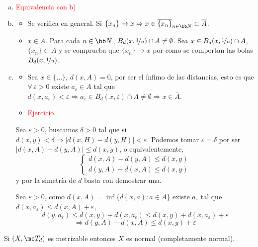 \begin{sol} \,
    \begin{enumerate}[a)]
        \item \textcolor{red}{Equivalencia con b)}
        \item \begin{itemize}
        \item[$\boxed{\supseteq}$] Se verifica en general. Si $\{x_n\} \to x \Rightarrow x\in \overline{\{x_n\}}_{n \in \bb N} \subset \overline{A}$.
        \item[$\boxed{\subseteq}$] $x\in \overline{A}$. Para cada $n\in \bb N$, $B_d(x,\nicefrac{1}{n}) \cap A \neq \emptyset$. Sea $x\in B_d(x,\nicefrac{1}{n}) \cap A $, $\{x_n\} \subset A$ y se comprueba que $\{x_n\} \to x$ por como se comportan las bolas $B_d(x,\nicefrac{1}{n})$. 
        \end{itemize}
        \item \begin{itemize}
        \item[$\boxed{\supseteq}$] Sea $x\in \{\dots\}$, $d(x,A)=0$, por ser el \'infimo de las distancias, esto es que $\forall \, \varepsilon >0$ existe $a_{\varepsilon} \in A$ tal que $d(x,a_{\varepsilon})< \varepsilon \Rightarrow a_{\varepsilon} \in B_d(x, \varepsilon) \cap A \neq \emptyset \Rightarrow x\in \overline{A}$. 
        \item[$\boxed{\subseteq}$] \textcolor{red}{Ejercicio}
        \end{itemize}
        Sea $\varepsilon >0$, buscamos $\delta > 0$ tal que si $d(x,y)< \delta \Rightarrow |d(x,H) - d(y, H)| < \varepsilon$. Podemos tomar $\varepsilon = \delta$ por ser $|d(x,A) - d(y,A)| \leq d(x,y)$, o equivalentemente,
        $$ \begin{cases}
            d(x,A) - d(y,A) \leq d(x,y)  \\ d(y,A) -  d(x,A)  \leq d(x,y) 
        \end{cases}$$
    y por la simetr\'ia de $d$ basta con demostrar una. 

    Sea $\varepsilon> 0$, como $d(x,A) = \inf\{ d(x,a) : a\in A\}$ existe $a_{\varepsilon}$ tal que $d(x, a_{\varepsilon}) \leq d(x, A) + \varepsilon$,
    $$d(y,a_{\varepsilon}) \leq d(x,y) + d(x, a_{\varepsilon}) \leq d(x,y) + d(x,a_{\varepsilon}) + \varepsilon $$
    $$ \Rightarrow d(y,A) - d(x,A) \leq d(x,y) +\varepsilon$$
    \end{enumerate}
\end{sol}
\begin{ejer}
    Si $(X, \mc T_d)$ es metrizable entonces $X$ es normal (completamente normal). 
\end{ejer}
